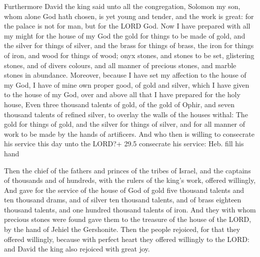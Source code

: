  Furthermore David the king said unto all the congregation,
Solomon my son, whom alone God hath chosen, is yet young and tender, and
the work is great: for the palace is not for man, but for the LORD God.
 Now I have prepared with all my might for the house of my
God the gold for things to be made of gold, and the silver for things of
silver, and the brass for things of brass, the iron for things of iron,
and wood for things of wood; onyx stones, and stones to be set,
glistering stones, and of divers colours, and all manner of precious
stones, and marble stones in abundance.  Moreover, because I
have set my affection to the house of my God, I have of mine own proper
good, of gold and silver, which I have given to the house of my God,
over and above all that I have prepared for the holy house, 
Even three thousand talents of gold, of the gold of Ophir, and seven
thousand talents of refined silver, to overlay the walls of the houses
withal:  The gold for things of gold, and the silver for
things of silver, and for all manner of work to be made by the hands of
artificers. And who then is willing to consecrate his service this day
unto the LORD?+ 29.5 consecrate his service: Heb. fill his hand

 Then the chief of the fathers and princes of the tribes
of Israel, and the captains of thousands and of hundreds, with the
rulers of the king's work, offered willingly,  And gave for
the service of the house of God of gold five thousand talents and ten
thousand drams, and of silver ten thousand talents, and of brass
eighteen thousand talents, and one hundred thousand talents of iron.
 And they with whom precious stones were found gave them to
the treasure of the house of the LORD, by the hand of Jehiel the
Gershonite.  Then the people rejoiced, for that they offered
willingly, because with perfect heart they offered willingly to the
LORD: and David the king also rejoiced with great joy.

